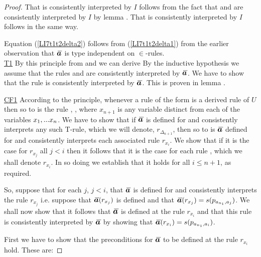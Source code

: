 \begin{proof}
That    is consistently interpreted by $I$ follows 
from the fact that   and  
are consistently interpreted by $I$ by lemma .
That    is consistently interpreted by $I$ follows in the same way.

Equation (\ref{LI7t1t2delta2}) follows from (\ref{LI7t1t2delta1}) from the earlier observation that $\Ibar$ is type independent on $\in$-rules. \\
\underline{T1}
By this principle from  and  we can derive 
By the inductive hypothesis we assume that the rules    and  are
consistently interpreted by $\Ibar$. We have to show that the rule  is consistently interpreted by $\Ibar$.
This is proven in lemma .

\underline{CF1} According to the principle, whenever a rule of the form  is a derived rule of $U$ 
then so to is the rule , \foreachi[n+1], where $x_{n+1}$ is any variable distinct from each of the variables $x_1,...x_n$.
We have to show that if $\Ibar$ is defined for and consistently interprets any such T-rule, which we will denote, $r_{\Delta_{n+1}}$, 
then so to is $\Ibar$ defined for and consistently interprets each associated rule $r_{x_i}$. 
We show that  if it is the case for $r_{x_j}$ all $j <i$ 
then it follows that it is the case for each rule , which we shall denote  $r_{x_i}$. 
In so doing we establish that it holds for all $i \leq n +1 $, as required. 

So, suppose that for each $j$, $j < i$, that $\Ibar$ is defined for and consistently interprets the rule $r_{x_j}$ i.e. suppose that  $\Ibar(r_{x_j})$ is defined and that
$\Ibar(r_{x_j})=s(p_{a_{n_1},a_j})$. 
We shall now show that it follows that 
$\Ibar$ is defined at the rule $r_{x_i}$ and that this rule is consistently interpreted by $\Ibar$ by showing that
$\Ibar(r_{x_i})=s(p_{a_{n_1},a_i})$. 

First we have to show that the preconditions for $\Ibar$ to be defined at the rule $r_{x_i}$ hold. These are:


\end{proof}

